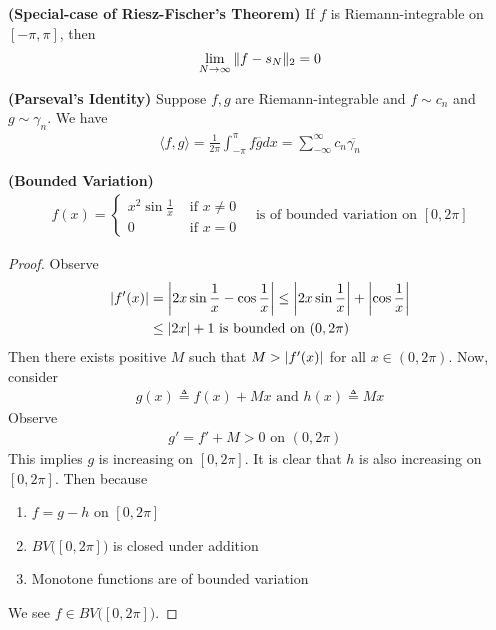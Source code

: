 \documentclass{report}
\begin{document}
\begin{theorem}
\textbf{(Special-case of Riesz-Fischer's Theorem)} If $f$ is Riemann-integrable on $[-\pi,\pi]$, then
\begin{align*}
 \lim_{N\to \infty}\| f-s_N \|_2 = 0 
\end{align*}
\end{theorem}
\begin{theorem}
\textbf{(Parseval's Identity)} Suppose $f,g$ are Riemann-integrable and $f \sim c_n$ and $g \sim \gamma _n$. We have 
\begin{align*}
\langle f,g\rangle = \frac{1}{2\pi}\int_{-\pi}^{\pi} f\overline{g}dx=\sum_{-\infty}^{\infty} c_n \overline{\gamma _n}
\end{align*}
\end{theorem}
\begin{theorem}
\textbf{(Bounded Variation)} 
\begin{align*}
f(x)=\begin{cases}
  x^2 \sin \frac{1}{x} & \text{ if $x\neq 0$ }\\
  0& \text{ if $x=0$ }
\end{cases}\text{ is of bounded variation on }[0,2\pi]
\end{align*}
\end{theorem}
\begin{proof}
Observe 
\begin{align*}
  \left|f'(x)\right| &=\left|2x \sin \frac{1}{x} - \cos \frac{1}{x}\right|\leq \left|2x\sin \frac{1}{x}\right| + \left|\cos \frac{1}{x}\right|\\
&\leq \left|2x\right|+ 1 \text{ is bounded on $(0,2\pi)$ }
\end{align*}
Then there exists positive $M$ such that $M>\left|f'(x)\right|$ for all $x \in (0,2\pi)$. Now, consider 
\begin{align*}
g(x)\triangleq f(x)+Mx \text{ and }h(x)\triangleq Mx
\end{align*}
Observe
\begin{align*}
g'=f'+M>0\text{ on $(0,2\pi)$ }
\end{align*}
This implies $g$ is increasing on $[0,2\pi]$. It is clear that  $h$ is also increasing on $[0,2\pi]$. Then because 
\begin{enumerate}[label=(\alph*)]
  \item $f=g-h$ on $[0,2\pi]$
  \item  $BV\big([0,2\pi]\big)$ is closed under addition 
  \item Monotone functions are of bounded variation
\end{enumerate}
We see $f\in BV\big([0,2\pi] \big)$.
\end{proof}
\end{document}
